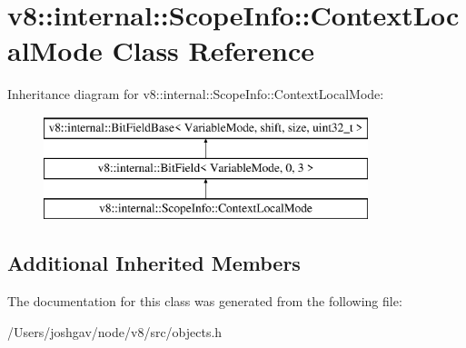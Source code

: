 \hypertarget{classv8_1_1internal_1_1_scope_info_1_1_context_local_mode}{}\section{v8\+:\+:internal\+:\+:Scope\+Info\+:\+:Context\+Local\+Mode Class Reference}
\label{classv8_1_1internal_1_1_scope_info_1_1_context_local_mode}
Inheritance diagram for v8\+:\+:internal\+:\+:Scope\+Info\+:\+:Context\+Local\+Mode\+:\begin{figure}[H]
\begin{center}
\leavevmode
\includegraphics[height=3.000000cm]{classv8_1_1internal_1_1_scope_info_1_1_context_local_mode}
\end{center}
\end{figure}
\subsection*{Additional Inherited Members}


The documentation for this class was generated from the following file\+:\begin{DoxyCompactItemize}
\item 
/\+Users/joshgav/node/v8/src/objects.\+h\end{DoxyCompactItemize}
